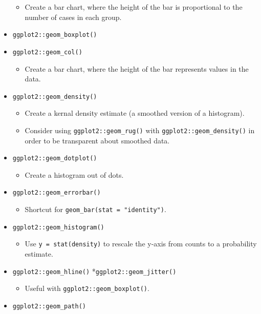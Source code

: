 \documentclass[
]{book}
\providecommand{\tightlist}{%
  \setlength{\itemsep}{0pt}\setlength{\parskip}{0pt}}
\begin{document}
\begin{itemize}
  \begin{itemize}
  \tightlist
  \item
    Create a bar chart, where the height of the bar is proportional to the number of cases in each group.
  \end{itemize}
\item
  \texttt{ggplot2::geom\_boxplot()}
\item
  \texttt{ggplot2::geom\_col()}

  \begin{itemize}
  \tightlist
  \item
    Create a bar chart, where the height of the bar represents values in the data.
  \end{itemize}
\item
  \texttt{ggplot2::geom\_density()}

  \begin{itemize}
  \tightlist
  \item
    Create a kernal density estimate (a smoothed version of a histogram).
  \item
    Consider using \texttt{ggplot2::geom\_rug()} with \texttt{ggplot2::geom\_density()} in order to be transparent about smoothed data.
  \end{itemize}
\item
  \texttt{ggplot2::geom\_dotplot()}

  \begin{itemize}
  \tightlist
  \item
    Create a histogram out of dots.
  \end{itemize}
\item
  \texttt{ggplot2::geom\_errorbar()}

  \begin{itemize}
  \tightlist
  \item
    Shortcut for \texttt{geom\_bar(stat\ =\ "identity")}.
  \end{itemize}
\item
  \texttt{ggplot2::geom\_histogram()}

  \begin{itemize}
  \tightlist
  \item
    Use \texttt{y\ =\ stat(density)} to rescale the y-axis from counts to a probability estimate.
  \end{itemize}
\item
  \texttt{ggplot2::geom\_hline()}
  *\texttt{ggplot2::geom\_jitter()}

  \begin{itemize}
  \tightlist
  \item
    Useful with \texttt{ggplot2::geom\_boxplot()}.
  \end{itemize}
\item
  \texttt{ggplot2::geom\_path()}


\end{itemize}
\end{document}
